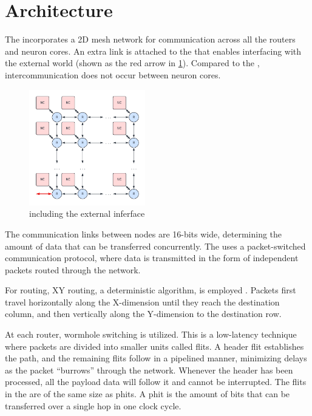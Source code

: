 \section{Architecture}
The \confignoc{} incorporates a 2D mesh network for communication across all the routers and neuron cores.
An extra link is attached to the \confignoc{} that enables interfacing with the external world (shown as the red arrow in \cref{fig:config_noc_ext}).
Compared to the \eventnoc{}, intercommunication does not occur between neuron cores.

\begin{figure}[hbtp]
\centering    
\includegraphics[width=0.45\textwidth]{assets/config_noc_inj.pdf}
\caption{\confignoc{} including the external inferface}
\label{fig:config_noc_ext}
\end{figure}

The communication links between nodes are 16-bits wide, determining the amount of data that can be transferred concurrently.
The \confignoc{} uses a packet-switched communication protocol, where data is transmitted in the form of independent packets routed through the network.

For routing, XY routing, a deterministic algorithm, is employed \autocite{glassTurnModelAdaptive1992}.
Packets first travel horizontally along the X-dimension until they reach the destination column, and then vertically along the Y-dimension to the destination row.

At each router, wormhole switching is utilized.
This is a low-latency technique where packets are divided into smaller units called flits.
A header flit establishes the path, and the remaining flits follow in a pipelined manner, minimizing delays as the packet ``burrows'' through the network.
Whenever the header has been processed, all the payload data will follow it and cannot be interrupted.
The flits in the \confignoc{} are of the same size as phits.
A phit is the amount of bits that can be transferred over a single hop in one clock cycle.


